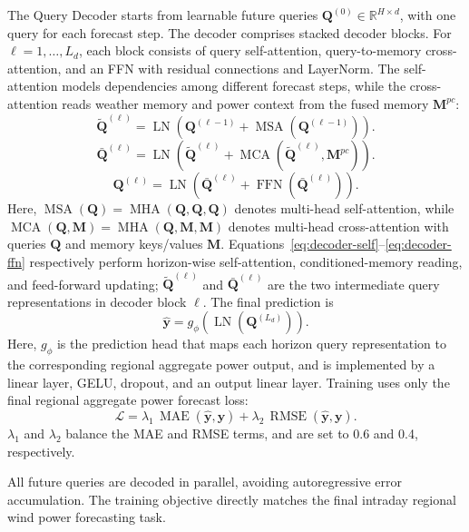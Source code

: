 The Query Decoder starts from learnable future queries
\(\mathbf{Q}^{(0)}\in\mathbb{R}^{H\times d}\), with one query for each forecast step. The decoder comprises stacked decoder blocks. For \(\ell=1,\ldots,L_d\), each block consists of query self-attention, query-to-memory cross-attention, and an FFN with residual connections and LayerNorm. The self-attention models dependencies among different forecast steps, while the cross-attention reads weather memory and power context from the fused memory \(\mathbf{M}^{pc}\):
\begin{equation}
\label{eq:decoder-self}
\tilde{\mathbf{Q}}^{(\ell)}=\operatorname{LN}\!\left(
\mathbf{Q}^{(\ell-1)}+\operatorname{MSA}(\mathbf{Q}^{(\ell-1)})\right).
\end{equation}
\begin{equation}
\label{eq:decoder-cross}
\bar{\mathbf{Q}}^{(\ell)}=\operatorname{LN}\!\left(
\tilde{\mathbf{Q}}^{(\ell)}+\operatorname{MCA}(\tilde{\mathbf{Q}}^{(\ell)},\mathbf{M}^{pc})\right).
\end{equation}
\begin{equation}
\label{eq:decoder-ffn}
\mathbf{Q}^{(\ell)}=\operatorname{LN}\!\left(\bar{\mathbf{Q}}^{(\ell)}
+\operatorname{FFN}(\bar{\mathbf{Q}}^{(\ell)})\right).
\end{equation}
Here, \(\operatorname{MSA}(\mathbf{Q})=\operatorname{MHA}(\mathbf{Q},\mathbf{Q},\mathbf{Q})\) denotes multi-head self-attention, while \(\operatorname{MCA}(\mathbf{Q},\mathbf{M})=\operatorname{MHA}(\mathbf{Q},\mathbf{M},\mathbf{M})\) denotes multi-head cross-attention with queries \(\mathbf{Q}\) and memory keys/values \(\mathbf{M}\). Equations~\eqref{eq:decoder-self}--\eqref{eq:decoder-ffn} respectively perform horizon-wise self-attention, conditioned-memory reading, and feed-forward updating; \(\tilde{\mathbf{Q}}^{(\ell)}\) and \(\bar{\mathbf{Q}}^{(\ell)}\) are the two intermediate query representations in decoder block \(\ell\).
The final prediction is
\begin{equation}
\hat{\mathbf{y}}=g_{\phi}(\operatorname{LN}(\mathbf{Q}^{(L_d)})).
\end{equation}
Here, \(g_{\phi}\) is the prediction head that maps each horizon query representation to the corresponding regional aggregate power output, and is implemented by a linear layer, GELU, dropout, and an output linear layer.
Training uses only the final regional aggregate power forecast loss:
\begin{equation}
\mathcal{L}=\lambda_1\,\operatorname{MAE}(\hat{\mathbf{y}},\mathbf{y})
+\lambda_2\,\operatorname{RMSE}(\hat{\mathbf{y}},\mathbf{y}).
\end{equation}
\(\lambda_1\) and \(\lambda_2\) balance the MAE and RMSE terms, and are set to 0.6 and 0.4, respectively.

All future queries are decoded in parallel, avoiding autoregressive error accumulation. The training objective directly matches the final intraday regional wind power forecasting task.
